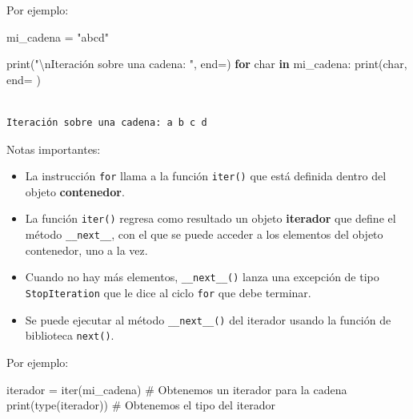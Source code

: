 \documentclass[
  spanish,
  letterpaper,
]{scrbook}
\newenvironment{Shaded}{\begin{snugshade}}{\end{snugshade}}
\newcommand{\BuiltInTok}[1]{\textcolor[rgb]{0.00,0.23,0.31}{#1}}
\newcommand{\CharTok}[1]{\textcolor[rgb]{0.13,0.47,0.30}{#1}}
\newcommand{\CommentTok}[1]{\textcolor[rgb]{0.37,0.37,0.37}{#1}}
\newcommand{\ControlFlowTok}[1]{\textcolor[rgb]{0.00,0.23,0.31}{\textbf{#1}}}
\newcommand{\KeywordTok}[1]{\textcolor[rgb]{0.00,0.23,0.31}{\textbf{#1}}}
\newcommand{\NormalTok}[1]{\textcolor[rgb]{0.00,0.23,0.31}{#1}}
\newcommand{\OperatorTok}[1]{\textcolor[rgb]{0.37,0.37,0.37}{#1}}
\newcommand{\StringTok}[1]{\textcolor[rgb]{0.13,0.47,0.30}{#1}}
\providecommand{\tightlist}{%
  \setlength{\itemsep}{0pt}\setlength{\parskip}{0pt}}
\theoremstyle{definition}
\theoremstyle{remark}
\begin{document}
Por ejemplo:

\begin{Shaded}
\begin{Highlighting}[]
\NormalTok{mi\_cadena }\OperatorTok{=} \StringTok{"abcd"}

\BuiltInTok{print}\NormalTok{(}\StringTok{"}\CharTok{\textbackslash{}n}\StringTok{Iteración sobre una cadena: "}\NormalTok{, end}\OperatorTok{=}\StringTok{\textquotesingle{}\textquotesingle{}}\NormalTok{)}
\ControlFlowTok{for}\NormalTok{ char }\KeywordTok{in}\NormalTok{ mi\_cadena:}
    \BuiltInTok{print}\NormalTok{(char, end}\OperatorTok{=}\StringTok{\textquotesingle{} \textquotesingle{}}\NormalTok{)}
\end{Highlighting}
\end{Shaded}

\begin{verbatim}

Iteración sobre una cadena: a b c d 
\end{verbatim}

Notas importantes:

\begin{itemize}
\tightlist
\item
  La instrucción \texttt{for} llama a la función \texttt{iter()} que
  está definida dentro del objeto \textbf{contenedor}.
\item
  La función \texttt{iter()} regresa como resultado un objeto
  \textbf{iterador} que define el método \texttt{\_\_next\_\_}, con el
  que se puede acceder a los elementos del objeto contenedor, uno a la
  vez.
\item
  Cuando no hay más elementos, \texttt{\_\_next\_\_()} lanza una
  excepción de tipo \texttt{StopIteration} que le dice al ciclo
  \texttt{for} que debe terminar.
\item
  Se puede ejecutar al método \texttt{\_\_next\_\_()} del iterador
  usando la función de biblioteca \texttt{next()}.
\end{itemize}

Por ejemplo:

\begin{Shaded}
\begin{Highlighting}[]
\NormalTok{iterador }\OperatorTok{=} \BuiltInTok{iter}\NormalTok{(mi\_cadena) }\CommentTok{\# Obtenemos un iterador para la cadena}
\BuiltInTok{print}\NormalTok{(}\BuiltInTok{type}\NormalTok{(iterador)) }\CommentTok{\# Obtenemos el tipo del iterador}
\end{Highlighting}
\end{Shaded}
\end{document}
